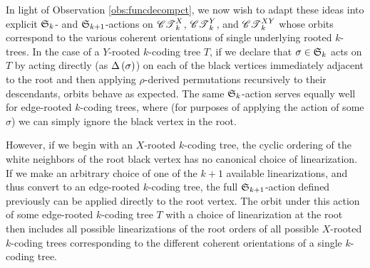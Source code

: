 \documentclass[distribution,draft]{brandiss} %
\numberwithin{section}{chapter}
\numberwithin{figure}{chapter}
\begin{document}
In light of Observation \ref{obs:funcdecompct}, we now wish to adapt these ideas into explicit $ \mathfrak{S}_{k} $- and $ \mathfrak{S}_{k+1} $-actions on $\mathscr{CT}_{k}^{X}$, $\mathscr{CT}_{k}^{Y}$, and $\mathscr{CT}_{k}^{XY}$ whose orbits correspond to the various coherent orientations of single underlying rooted $k$-trees.
In the case of a $Y$-rooted $k$-coding tree $T$, if we declare that $\sigma \in  \mathfrak{S}_{k} $ acts on $T$ by acting directly (as $\Delta \left( {\sigma} \right)$) on each of the black vertices immediately adjacent to the root and then applying $\rho$-derived permutations recursively to their descendants, orbits behave as expected.
The same $ \mathfrak{S}_{k} $-action serves equally well for edge-rooted $k$-coding trees, where (for purposes of applying the action of some $\sigma$) we can simply ignore the black vertex in the root.

However, if we begin with an $X$-rooted $k$-coding tree, the cyclic ordering of the white neighbors of the root black vertex has no canonical choice of linearization.
If we make an arbitrary choice of one of the $k+1$ available linearizations, and thus convert to an edge-rooted $k$-coding tree, the full $ \mathfrak{S}_{k+1} $-action defined previously can be applied directly to the root vertex.
The orbit under this action of some edge-rooted $k$-coding tree $T$ with a choice of linearization at the root then includes all possible linearizations of the root orders of all possible $X$-rooted $k$-coding trees corresponding to the different coherent orientations of a single $k$-coding tree.
\end{document}

